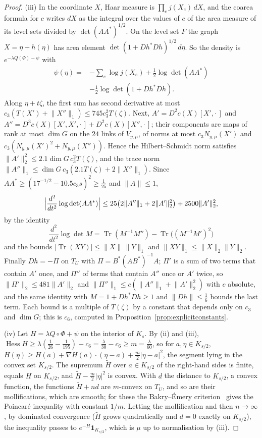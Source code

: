 \documentclass[11pt]{amsart}
\theoremstyle{definition}
\theoremstyle{remark}
\numberwithin{equation}{section}
\newcommand{\Tr}{\operatorname{Tr}}
\newcommand{\Hess}{\operatorname{Hess}}
\begin{document}
\begin{proof}
(iii) In the coordinate $X$, Haar measure is $\prod_ej(X_e)\,dX$, and the
coarea formula for $c$ writes $dX$ as the integral over the values of $c$
of the area measure of its level sets divided by $\det(AA^*)^{1/2}$. On the
level set $F$ the graph $X=\eta+h(\eta)$ has area element $\det(1+Dh^*Dh)
^{1/2}\,d\eta$. So the density is $e^{-\lambda Q(\Phi)-\psi}$ with
\[
\begin{split}
\psi(\eta)={}&-\sum_e\log j(X_e)+\tfrac12\log\det(AA^*)\\
&-\tfrac12\log\det(1+Dh^*Dh).
\end{split}
\]
Along $\eta+t\zeta$, the first sum has second derivative at most $c_3(T(X')
+\lVert X''\rVert_1)\le745c_3^2T(\zeta)$. Next, $A'=D^2c(X)[X',\cdot\,]$ and
$A''=D^3c(X)[X',X',\cdot\,]+D^2c(X)[X'',\cdot\,]$; their components are maps
of rank at most $\dim G$ on the $24$ links of $V_{y,\mu}$, of norms at most
$c_3N_{y,\mu}(X')$ and $c_3(N_{y,\mu}(X')^2+N_{y,\mu}(X''))$. Hence the
Hilbert--Schmidt norm satisfies $\lVert A'\rVert_2^2\le2.1\dim G\,c_3^2T(
\zeta)$, and the trace norm $\lVert A''\rVert_1\le\dim G\,c_3(2.1T(\zeta)+2
\lVert X''\rVert_1)$. Since $AA^*\ge(17^{-1/2}-10.5c_3s)^2\ge\frac1{25}$ and
$\lVert A\rVert\le1$,
\[
\Bigl\lvert\frac{d^2}{dt^2}\log\det(AA^*)\Bigr\rvert\le25\bigl(2\lVert A''
\rVert_1+2\lVert A'\rVert_2^2\bigr)+2500\lVert A'\rVert_2^2,
\]
by the identity
\[
\frac{d^2}{dt^2}\log\det M=\Tr(M^{-1}M'')-\Tr\bigl((M^{-1}M')^2\bigr)
\]
and the bounds $\lvert\Tr(XY)\rvert\le\lVert X\rVert\,\lVert Y\rVert_1$ and
$\lVert XY\rVert_1\le\lVert X\rVert_2\lVert Y\rVert_2$. Finally $Dh=-\Pi$ on $T_U$ with $\Pi=B^*(
AB^*)^{-1}A$; $\Pi'$ is a sum of two terms that contain $A'$ once, and
$\Pi''$ of terms that contain $A''$ once or $A'$ twice, so $\lVert\Pi'\rVert
_2\le481\lVert A'\rVert_2$ and $\lVert\Pi''\rVert_1\le c(\lVert A''\rVert
_1+\lVert A'\rVert_2^2)$ with $c$ absolute, and the same identity with $M=1+
Dh^*Dh\ge1$ and $\lVert Dh\rVert\le\frac16$ bounds the last term. Each bound
is a multiple of $T(\zeta)$ by a constant that depends only on $c_3$ and
$\dim G$; this is $c_6$, computed in
Proposition~\ref{prop:explicitconstants}.

(iv) Let $H=\lambda Q\circ\Phi+\psi$ on the interior of $K_s$. By (ii) and
(iii), $\Hess H\ge\lambda(\frac1{26}-\frac1{195})-c_6=\frac\lambda{30}-c_6
\ge m=\frac\lambda{60}$, so for $a,\eta\in K_{s/2}$, $H(\eta)\ge H(a)+\nabla
H(a)\cdot(\eta-a)+\frac m2\lvert\eta-a\rvert^2$, the segment lying in the
convex set $K_{s/2}$. The supremum $\tilde H$ over $a\in K_{s/2}$ of the
right-hand sides is finite, equals $H$ on $K_{s/2}$, and $\tilde H-\frac m2
\lvert\eta\rvert^2$ is convex. With $d$ the distance to $K_{s/2}$, a convex
function, the functions $\tilde H+nd$ are $m$-convex on $T_U$, and so are
their mollifications, which are smooth; for these the Bakry--\'Emery
criterion~\cite{BGL14} gives the Poincar\'e inequality with constant $1/m$.
Letting the mollification and then $n\to\infty$, by dominated convergence
($\tilde H$ grows quadratically and $d=0$ exactly on $K_{s/2}$), the
inequality passes to $e^{-H}\mathbf 1_{K_{s/2}}$, which is $\mu$ up to
normalisation by (iii).
\end{proof}
\end{document}
